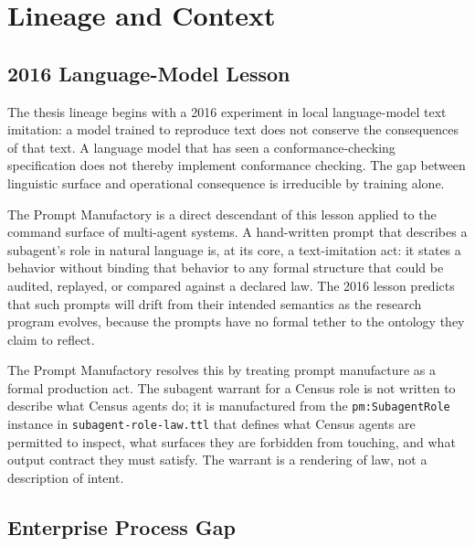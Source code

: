 
\section{Lineage and Context}
\label{sec:research-prompt-manufactory-lineage}

\subsection{2016 Language-Model Lesson}
\label{sec:research-prompt-manufactory-lineage-2016}

The thesis lineage begins with a 2016 experiment in local language-model text imitation:
a model trained to reproduce text does not conserve the consequences of that text. A
language model that has seen a conformance-checking specification does not thereby
implement conformance checking. The gap between linguistic surface and operational
consequence is irreducible by training alone.

The Prompt Manufactory is a direct descendant of this lesson applied to the command
surface of multi-agent systems. A hand-written prompt that describes a subagent's role
in natural language is, at its core, a text-imitation act: it states a behavior without
binding that behavior to any formal structure that could be audited, replayed, or
compared against a declared law. The 2016 lesson predicts that such prompts will drift
from their intended semantics as the research program evolves, because the prompts have
no formal tether to the ontology they claim to reflect.

The Prompt Manufactory resolves this by treating prompt manufacture as a formal
production act. The subagent warrant for a Census role is not written to describe what
Census agents do; it is manufactured from the \texttt{pm:SubagentRole} instance in
\texttt{subagent-role-law.ttl} that defines what Census agents are permitted to inspect,
what surfaces they are forbidden from touching, and what output contract they must
satisfy. The warrant is a rendering of law, not a description of intent.

\subsection{Enterprise Process Gap}
\label{sec:research-prompt-manufactory-lineage-enterprise}

